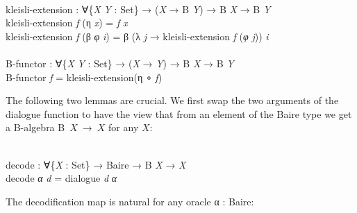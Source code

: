 \documentclass{entcs} \usepackage{prentcsmacro}
\newcommand{\AgdaC}[1]{\mbox{#1}}
\newcommand{\AgdaFontStyle}[1]{\textsf{#1}}
\newcommand{\AgdaBoundFontStyle}[1]{\textit{#1}}
\newcommand{\AgdaSymbol}      [1]{\textcolor{AgdaSymbol}{#1}}
\newcommand{\AgdaPrimitiveType}[1]
    {\AgdaFontStyle{\textcolor{AgdaPrimitiveType}{#1}}}
\newcommand{\AgdaBound}    [1]{\AgdaBoundFontStyle{\textcolor{AgdaBound}{#1}}}
\newcommand{\AgdaInductiveConstructor}[1]
    {\AgdaFontStyle{\textcolor{AgdaInductiveConstructor}{#1}}}
\newcommand{\AgdaFunction} [1]{\AgdaFontStyle{\textcolor{AgdaFunction}{#1}}}
\newcommand{\AgdaCodeStyle}{\small}
\newenvironment{code}%
{\noindent\AgdaCodeStyle\pboxed}%
{\endpboxed\par\noindent%
\ignorespacesafterend}
\begin{document}
\begin{code}\>\<%
\\
\>\AgdaFunction{kleisli-extension} \AgdaSymbol{:} \AgdaSymbol{∀\{}\AgdaBound{X} \AgdaBound{Y} \AgdaSymbol{:} \AgdaPrimitiveType{Set}\AgdaSymbol{\}} \AgdaSymbol{→} \AgdaSymbol{(}\AgdaBound{X} \AgdaSymbol{→} \AgdaFunction{B} \AgdaBound{Y}\AgdaSymbol{)} \AgdaSymbol{→} \AgdaFunction{B} \AgdaBound{X} \AgdaSymbol{→} \AgdaFunction{B} \AgdaBound{Y}\<%
\\
\>\AgdaFunction{kleisli-extension} \AgdaBound{f} \AgdaSymbol{(}\AgdaInductiveConstructor{η} \AgdaBound{x}\AgdaSymbol{)} \<[28]%
\>[28]\AgdaSymbol{=} \AgdaBound{f} \AgdaBound{x}\<%
\\
\>\AgdaFunction{kleisli-extension} \AgdaBound{f} \AgdaSymbol{(}\AgdaInductiveConstructor{β} \AgdaBound{φ} \AgdaBound{i}\AgdaSymbol{)} \AgdaSymbol{=} \AgdaInductiveConstructor{β} \AgdaSymbol{(λ} \AgdaBound{j} \AgdaSymbol{→} \AgdaFunction{kleisli-extension} \AgdaBound{f} \AgdaSymbol{(}\AgdaBound{φ} \AgdaBound{j}\AgdaSymbol{))} \AgdaBound{i}\<%
\\
%
\\
\>\AgdaFunction{B-functor} \AgdaSymbol{:} \AgdaSymbol{∀\{}\AgdaBound{X} \AgdaBound{Y} \AgdaSymbol{:} \AgdaPrimitiveType{Set}\AgdaSymbol{\}} \AgdaSymbol{→} \AgdaSymbol{(}\AgdaBound{X} \AgdaSymbol{→} \AgdaBound{Y}\AgdaSymbol{)} \AgdaSymbol{→} \AgdaFunction{B} \AgdaBound{X} \AgdaSymbol{→} \AgdaFunction{B} \AgdaBound{Y}\<%
\\
\>\AgdaFunction{B-functor} \AgdaBound{f} \AgdaSymbol{=} \AgdaFunction{kleisli-extension}\AgdaSymbol{(}\AgdaInductiveConstructor{η} \AgdaFunction{∘} \AgdaBound{f}\AgdaSymbol{)}\<%
\\
\>\<\end{code}
The following two lemmas are crucial. We first swap the two arguments
of the dialogue function to have the view that from an element of the
Baire type we get a B-algebra \AgdaC{B $X$ → $X$} for any \AgdaC{$X$}:

\begin{code}\>\<%
\\
\>\AgdaFunction{decode} \AgdaSymbol{:} \AgdaSymbol{∀\{}\AgdaBound{X} \AgdaSymbol{:} \AgdaPrimitiveType{Set}\AgdaSymbol{\}} \AgdaSymbol{→} \AgdaFunction{Baire} \AgdaSymbol{→} \AgdaFunction{B} \AgdaBound{X} \AgdaSymbol{→} \AgdaBound{X}\<%
\\
\>\AgdaFunction{decode} \AgdaBound{α} \AgdaBound{d} \AgdaSymbol{=} \AgdaFunction{dialogue} \AgdaBound{d} \AgdaBound{α}\<%
\\
\>\<\end{code}
The decodification map is natural for any oracle α : Baire:
%
%
\end{document}
